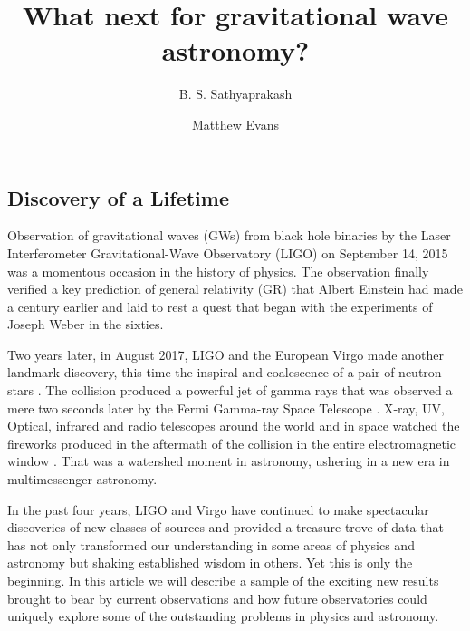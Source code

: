 \documentclass[twocolumn,aps,prd,nofootinbib,superscriptaddress,10pt,notitlepage,preprintnumbers] {revtex4-1}
\begin{document}
\title{What next for gravitational wave astronomy?}

\author{B. S. Sathyaprakash} %
\author{Matthew Evans}
\begin{abstract}
\end{abstract}
\maketitle
\subsection*{Discovery of a Lifetime}
Observation of gravitational waves (GWs) from black hole binaries by the Laser Interferometer Gravitational-Wave Observatory (LIGO) on September 14, 2015 \cite{GW150914} was a momentous occasion in the history of physics.  The observation finally verified a key prediction of general relativity (GR) that Albert Einstein \cite{Einstein:1915ca,Einstein:1918btx} had made a century earlier and laid to rest a quest that began with the experiments of Joseph Weber \cite{Weber:1960zz} in the sixties. 

Two years later, in August 2017, LIGO and the European Virgo made another landmark discovery, this time the inspiral and coalescence of a pair of neutron stars \cite{GW170817}. The collision produced a powerful jet of gamma rays that was observed a mere two seconds later by the Fermi Gamma-ray Space Telescope \cite{GW-GRB170817}. X-ray, UV, Optical, infrared and radio telescopes around the world and in space watched the fireworks produced in the aftermath of the collision in the entire electromagnetic window \cite{GBM:2017lvd}. That was a watershed moment in astronomy, ushering in a new era in multimessenger astronomy.

In the past four years, LIGO and Virgo have continued to make spectacular discoveries \cite{LIGOScientific:2019fpa} of new classes of sources \cite{Abbott:2020uma, LIGOScientific:2020stg} and provided a treasure trove of data that has not only transformed our understanding in some areas of physics and astronomy but shaking established wisdom in others. Yet this is only the beginning.  In this article we will describe a sample of the exciting new results brought to bear by current observations and how future observatories could uniquely explore some of the outstanding problems in physics and astronomy.
\end{document}
